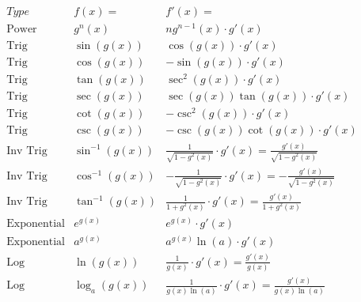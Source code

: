 \documentclass[handout]{ximera}
\begin{document}
\begin{center}
\[
\begin{array}{c|c|c}
		Type & f(x)= & f'(x)=  \\
		\hline
		\text{Power} & g^n(x) & ng^{n-1}(x)\cdot g'(x)  \\[6pt]
		\hline
		\text{Trig} & \sin\left(g(x)\right) & \cos\left(g(x)\right) \cdot g'(x) \\[6pt]
		\text{Trig} & \cos\left(g(x)\right) & -\sin\left(g(x)\right)\cdot g'(x)  \\[6pt]
		\hline
		\text{Trig} & \tan\left(g(x)\right) & \sec^2\left(g(x)\right) \cdot g'(x) \\[6pt]
		\text{Trig} & \sec\left(g(x)\right) & \sec\left(g(x)\right)\tan\left(g(x)\right) \cdot g'(x) \\[6pt]
		\hline
		\text{Trig} & \cot\left(g(x)\right) & -\csc^2\left(g(x)\right) \cdot g'(x)  \\[6pt]
		\text{Trig} & \csc\left(g(x)\right) & -\csc\left(g(x)\right)\cot\left(g(x)\right) \cdot g'(x)  \\[6pt]
		\hline
		\text{Inv Trig} & \sin^{-1}\left(g(x)\right) & \displaystyle{\frac{1}{\sqrt{1-g^2(x)}}} \cdot g'(x) = \frac{g'(x)}{\sqrt{1-g^2(x)}}  \\[6pt]
		\text{Inv Trig} & \cos^{-1}\left(g(x)\right) & \displaystyle{-\frac{1}{\sqrt{1-g^2(x)}}} \cdot g'(x) = -\frac{g'(x)}{\sqrt{1-g^2(x)}}\\[6pt]
		\text{Inv Trig} & \tan^{-1}\left(g(x)\right) & \displaystyle{\frac{1}{1+g^2(x)}} \cdot g'(x) = \frac{g'(x)}{1+g^2(x)} \\
		\hline
		\text{Exponential} & e^{g(x)} & e^{g(x)} \cdot g'(x) \\[6pt]
		\text{Exponential} & a^{g(x)} & a^{g(x)}\ln(a) \cdot g'(x) \\[6pt]
		\hline
		\text{Log} & \ln\left(g(x)\right) & \displaystyle{\frac{1}{g(x)}}\cdot g'(x) = \frac{g'(x)}{g(x)} \\[6pt]
		\text{Log} & \log_a\left(g(x)\right) & \displaystyle{\frac{1}{g(x)\ln(a)}}\cdot g'(x) = \frac{g'(x)}{g(x)\ln(a)}
	\end{array}
    \]
\end{center}
\end{document}
